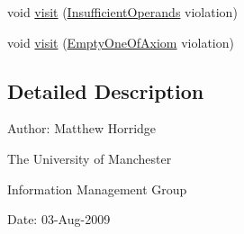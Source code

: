 \begin{DoxyCompactItemize}
\item 
void \hyperlink{interfaceorg_1_1semanticweb_1_1owlapi_1_1profiles_1_1_o_w_l2_d_l_profile_violation_visitor_a5ce0b41ff35e23295fcff4b947cd6a7b}{visit} (\hyperlink{classorg_1_1semanticweb_1_1owlapi_1_1profiles_1_1_insufficient_operands}{Insufficient\-Operands} violation)
\item 
void \hyperlink{interfaceorg_1_1semanticweb_1_1owlapi_1_1profiles_1_1_o_w_l2_d_l_profile_violation_visitor_a7af2fee2bdd1bdb7dc9ffe35a2bec51d}{visit} (\hyperlink{classorg_1_1semanticweb_1_1owlapi_1_1profiles_1_1_empty_one_of_axiom}{Empty\-One\-Of\-Axiom} violation)
\end{DoxyCompactItemize}


\subsection{Detailed Description}
Author\-: Matthew Horridge\par
 The University of Manchester\par
 Information Management Group\par
 Date\-: 03-\/\-Aug-\/2009 

